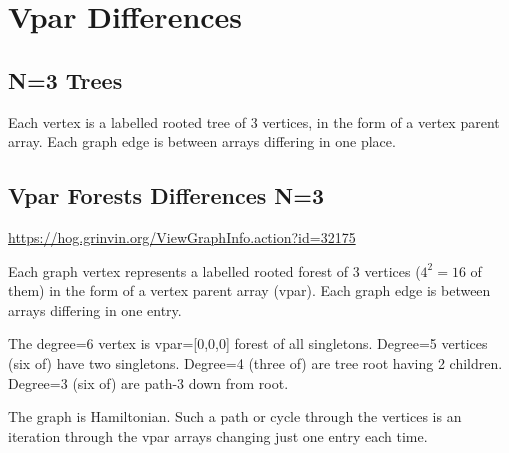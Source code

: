 \documentclass{article}
\begin{document}
\clearpage
\section{Vpar Differences}

\subsection{N=3 Trees}

Each vertex is a labelled rooted tree of 3 vertices, in the form of a
vertex parent array.  Each graph edge is between arrays differing in
one place.

\begin{center}
\end{center}

\subsection{Vpar Forests Differences N=3}

\url{https://hog.grinvin.org/ViewGraphInfo.action?id=32175}

Each graph vertex represents a labelled rooted forest of 3 vertices
($4^2 {=} 16$ of them) in the form of a vertex parent array (vpar).
Each graph edge is between arrays differing in one entry.

The degree=6 vertex is vpar=[0,0,0] forest of all singletons.
Degree=5 vertices (six of) have two singletons.  Degree=4 (three of)
are tree root having 2 children.  Degree=3 (six of) are path-3 down
from root.

The graph is Hamiltonian.  Such a path or cycle through the vertices
is an iteration through the vpar arrays changing just one entry each
time.
\end{document}
